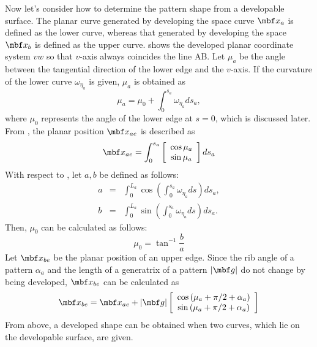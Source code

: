 \documentclass[E]{scitrans}
\begin{document}
Now let’s consider how to determine the pattern shape from a developable surface. The planar curve generated by developing the space curve $ \mbold{x}_a $ is defined as the lower curve, whereas that generated by developing the space $ \mbold{x}_b $ is defined as the upper curve.  shows the developed planar coordinate system $ vw $ so that $ v $-axis always coincides the line AB. Let $ \mu_a $ be the angle between the tangential direction of the lower edge and the $ v $-axis. 
If the curvature of the lower curve $ \omega_{\eta_a} $ is given, $ \mu_a $ is obtained as
\begin{equation}\label{eq:mu_eq}
\mu_a = \mu_0 + \int_{0}^{s_a} \omega_{\eta_a} ds_a,
\end{equation}
where $ \mu_0 $ represents the angle of the lower edge at $ s=0 $, which is discussed later. From , the planar position $ \mbold{x}_{ae} $ is described as
\begin{equation}\label{eq:x_LE}
\mbold{x}_{ae}  = \int_{0}^{s_a} \left[\begin{array}{cc} \cos \mu_a \\ \sin \mu_a \end{array}\right] ds_a
\end{equation}
With respect to , let $ a,b $ be defined as follows:
\begin{eqnarray}
a &=& \int_{0}^{L_a} \cos \left( \int_{0}^{s_a} \omega_{\eta_a} ds\right) ds_a, \\
b &=& \int_{0}^{L_a} \sin \left( \int_{0}^{s_a} \omega_{\eta_a} ds\right) ds_a. 
\end{eqnarray}
Then, $ \mu_0 $ can be calculated as follows:
\begin{equation}\label{eq:mu_0eq}
\mu_0 = \tan^{-1}\frac{b}{a}
\end{equation}
Let $ \mbold{x}_{be} $ be the planar position of an upper edge. Since the rib angle of a pattern $ \alpha_a $ and the length of a generatrix of a pattern $ |\mbold{g}| $ do not change by being developed, $ \mbold{x}_{be} $ can be calculated as 
\begin{equation}\label{eq:x_UE}
\mbold{x}_{be} = \mbold{x}_{ae} + |\mbold{g}| \left[\begin{array}{cc} \cos \left(\mu_a + \pi/2 + \alpha_a \right) \\ \sin \left(\mu_a + \pi/2 + \alpha_a \right)  \end{array}\right] 
\end{equation}
From above, a developed shape can be obtained when two curves, which lie on the developable surface, are given.
\end{document}
